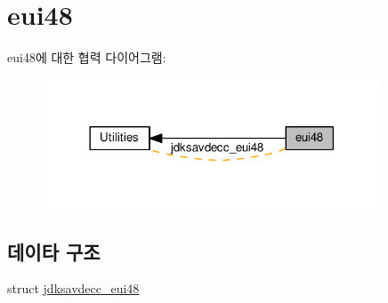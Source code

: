 \hypertarget{group__eui48}{}\section{eui48}
\label{group__eui48}
eui48에 대한 협력 다이어그램\+:
\nopagebreak
\begin{figure}[H]
\begin{center}
\leavevmode
\includegraphics[width=285pt]{group__eui48}
\end{center}
\end{figure}
\subsection*{데이타 구조}
\begin{DoxyCompactItemize}
\item 
struct \hyperlink{structjdksavdecc__eui48}{jdksavdecc\+\_\+eui48}
\end{DoxyCompactItemize}
